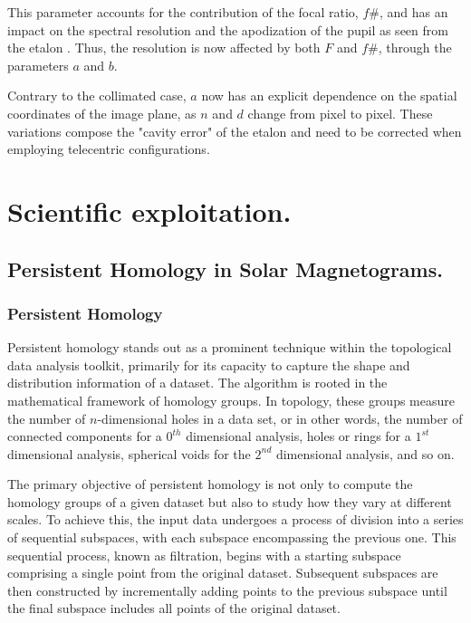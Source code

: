 \documentclass[12pt]{mythesis}
\begin{document}
This parameter accounts for the contribution of the focal ratio, $f\#$, and has an impact on the spectral resolution and the apodization of the pupil as seen from the etalon \citep{beckers}. Thus, the resolution is now affected by both $F$ and $f\#$, through the parameters $a$ and $b$.

Contrary to the collimated case, $a$ now has an explicit dependence on the spatial coordinates of the image plane, as $n$ and $d$ change from pixel to pixel. These variations compose the "cavity error" of the etalon and need to be corrected when employing telecentric configurations.



\chapter{\label{CH:Science}Scientific exploitation.}

\section{Persistent Homology in Solar Magnetograms.}

\subsection{Persistent Homology}

Persistent homology stands out as a prominent technique within the topological data analysis toolkit, primarily for its capacity to capture the shape and distribution information of a dataset. The algorithm is rooted in the mathematical framework of homology groups. In topology, these groups measure the number of $n$-dimensional holes in a data set, or in other words, the number of connected components for a  $0^{th}$ dimensional analysis, holes or rings for a $1^{st}$ dimensional analysis, spherical voids for the $2^{nd}$ dimensional analysis, and so on. 

The primary objective of persistent homology is not only to compute the homology groups of a given dataset but also to study how they vary at different scales. To achieve this, the input data undergoes a process of division into a series of sequential subspaces, with each subspace encompassing the previous one. This sequential process, known as filtration, begins with a starting subspace comprising a single point from the original dataset. Subsequent subspaces are then constructed by incrementally adding points to the previous subspace until the final subspace includes all points of the original dataset. 
\end{document}

